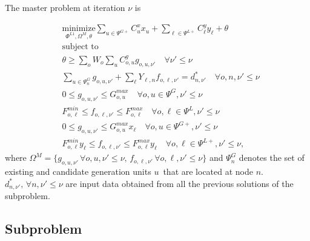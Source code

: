 The master problem at iteration $\nu$ is

\begin{align}
&\label{master_obj} \underset{\Phi^{L1}, \Omega^{M}, \theta}{\text{minimize}} \sum\limits_{u \in \Psi^{G+}} C^x_{u} x_{u} + \sum\limits_{\ell \in \Psi^{L+}} C^y_{\ell} y_{\ell} + \theta \\
&\text{subject to} \nonumber \\
&\theta \geq \sum\limits_o W_o \sum\limits_{u} C^g_{o,u} g_{o, u, \nu'} \quad \forall \nu' \leq \nu \\
&\sum\limits_{u \in \Psi^G_{n}} g_{o, u, \nu'} + \sum\limits_{\ell} Y_{\ell, n} f_{o, \ell, \nu'} = d_{n, \nu'}^* \quad \forall o, n, \nu' \leq \nu \\
&0 \leq g_{o, u, \nu'} \leq G_{o, u}^{max} \quad \forall o, u \in \Psi^G, \nu' \leq \nu \\
&F_{o, \ell}^{min} \leq f_{o, \ell, \nu'} \leq F_{o, \ell}^{max} \quad \forall o, \ell \in \Psi^L, \nu' \leq \nu \\
&0 \leq g_{o, u, \nu'} \leq G_{o, u}^{max} x_\ell \quad \forall o, u \in \Psi^{G+}, \nu' \leq \nu \\
&F_{o, \ell}^{min} y_\ell \leq f_{o, \ell, \nu'} \leq F_{o, \ell}^{max} y_\ell \quad \forall o, \ell \in \Psi^{L+}, \nu' \leq \nu,
\end{align}
where $\Omega^{M} = \{ g_{o,u,\nu'} \, \forall o, u, \nu' \leq \nu, \, f_{o, \ell, \nu'} \, \forall o, \ell, \nu' \leq \nu \}$ and $\Psi^G_{n}$ denotes the set of existing and candidate generation units $u$ that are located at node $n$. $d_{n, \nu'}^*, \, \forall n, \nu' \leq \nu$ are input data obtained from all the previous solutions of the subproblem.

\subsection{Subproblem}

